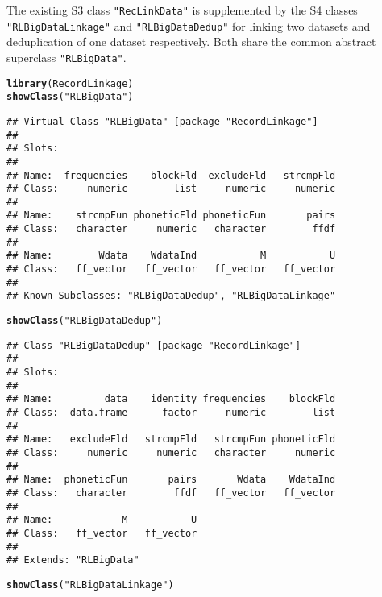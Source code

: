 \documentclass[a4paper]{article}\usepackage[]{graphicx}\usepackage[]{color}
\makeatletter
\newcommand{\hlstr}[1]{\textcolor[rgb]{0.192,0.494,0.8}{#1}}%
\newcommand{\hlstd}[1]{\textcolor[rgb]{0.345,0.345,0.345}{#1}}%
\newcommand{\hlkwd}[1]{\textcolor[rgb]{0.737,0.353,0.396}{\textbf{#1}}}%
\newenvironment{kframe}{%
 \def\at@end@of@kframe{}%
 \ifinner\ifhmode%
  \def\at@end@of@kframe{\end{minipage}}%
  \begin{minipage}{\columnwidth}%
 \fi\fi%
 \def\FrameCommand##1{\hskip\@totalleftmargin \hskip-\fboxsep
 \colorbox{shadecolor}{##1}\hskip-\fboxsep
     \hskip-\linewidth \hskip-\@totalleftmargin \hskip\columnwidth}%
 \MakeFramed {\advance\hsize-\width
   \@totalleftmargin\z@ \linewidth\hsize
   \@setminipage}}%
 {\par\unskip\endMakeFramed%
 \at@end@of@kframe}
\newenvironment{knitrout}{}{} %
\makeatother
\begin{document}
The existing S3 class \texttt{"RecLinkData"} is supplemented by the S4 classes
\texttt{"RLBigDataLinkage"} and \texttt{"RLBigDataDedup"} for linking two datasets
and deduplication of one dataset respectively. Both share the common abstract
superclass \texttt{"RLBigData"}.

\begin{knitrout}
\color{fgcolor}\begin{kframe}
\begin{alltt}
\hlkwd{library}\hlstd{(RecordLinkage)}
\hlkwd{showClass}\hlstd{(}\hlstr{"RLBigData"}\hlstd{)}
\end{alltt}
\begin{verbatim}
## Virtual Class "RLBigData" [package "RecordLinkage"]
## 
## Slots:
##                                                       
## Name:  frequencies    blockFld  excludeFld   strcmpFld
## Class:     numeric        list     numeric     numeric
##                                                       
## Name:    strcmpFun phoneticFld phoneticFun       pairs
## Class:   character     numeric   character        ffdf
##                                                       
## Name:        Wdata    WdataInd           M           U
## Class:   ff_vector   ff_vector   ff_vector   ff_vector
## 
## Known Subclasses: "RLBigDataDedup", "RLBigDataLinkage"
\end{verbatim}
\begin{alltt}
\hlkwd{showClass}\hlstd{(}\hlstr{"RLBigDataDedup"}\hlstd{)}
\end{alltt}
\begin{verbatim}
## Class "RLBigDataDedup" [package "RecordLinkage"]
## 
## Slots:
##                                                       
## Name:         data    identity frequencies    blockFld
## Class:  data.frame      factor     numeric        list
##                                                       
## Name:   excludeFld   strcmpFld   strcmpFun phoneticFld
## Class:     numeric     numeric   character     numeric
##                                                       
## Name:  phoneticFun       pairs       Wdata    WdataInd
## Class:   character        ffdf   ff_vector   ff_vector
##                               
## Name:            M           U
## Class:   ff_vector   ff_vector
## 
## Extends: "RLBigData"
\end{verbatim}
\begin{alltt}
\hlkwd{showClass}\hlstd{(}\hlstr{"RLBigDataLinkage"}\hlstd{)}
\end{alltt}

\end{kframe}
\end{knitrout}
\end{document}
